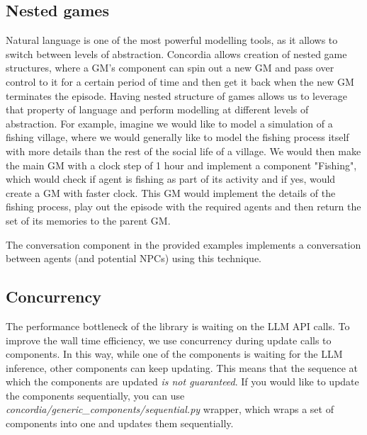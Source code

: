 \documentclass[11pt, a4paper, logo, twocolumn, internal, copyright, numbering]{googledeepmind}
\begin{document}
\subsection{Nested games}
Natural language is one of the most powerful modelling tools, as it allows to switch between levels of abstraction. 
Concordia allows creation of nested game structures, where a GM's component can spin out a new GM and pass over control to it for a certain period of time and then get it back when the new GM terminates the episode. 
Having nested structure of games allows us to leverage that property of language and perform modelling at different levels of abstraction.  
For example, imagine we would like to model a simulation of a fishing village, where we would generally like to model the fishing process itself with more details than the rest of the social life of a village. We would then make the main GM with a clock step of 1 hour and implement a component "Fishing", which would check if agent is fishing as part of its activity and if yes, would create a GM with faster clock. This GM would implement the details of the fishing process, play out the episode with the required agents and then return the set of its memories to the parent GM.

The conversation component in the provided examples implements a conversation between agents (and potential NPCs) using this technique.

\subsection{Concurrency}
The performance bottleneck of the library is waiting on the LLM API calls. To improve the wall time efficiency, we use concurrency during update calls to components. In this way, while one of the components is waiting for the LLM inference, other components can keep updating. This means that the sequence at which the components are updated \textit{is not guaranteed}. If you would like to update the components sequentially, you can use \textit{concordia/generic\_components/sequential.py} wrapper, which wraps a set of components into one and updates them sequentially.
\end{document}
